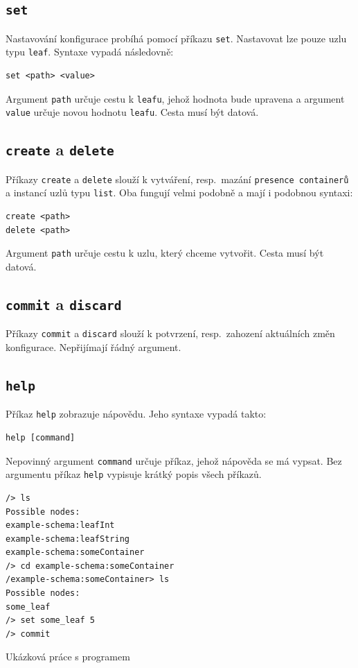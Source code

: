 \documentclass[thesis=B,czech,hidelinks]{FITthesis}[2019/03/06]
\begin{document}
\subsection{\texttt{set}}
Nastavování konfigurace probíhá pomocí příkazu \texttt{set}. Nastavovat lze pouze uzlu typu \texttt{leaf}. Syntaxe vypadá následovně:
\begin{verbatim}
set <path> <value>
\end{verbatim}
Argument \texttt{path} určuje cestu k \texttt{leafu}, jehož hodnota bude upravena a argument \texttt{value} určuje novou hodnotu \texttt{leafu}. Cesta musí být datová.

\subsection{\texttt{create} a \texttt{delete}}
Příkazy \texttt{create} a \texttt{delete} slouží k vytváření, resp.\ mazání \texttt{presence containerů} a instancí uzlů typu \texttt{list}. Oba fungují velmi podobně a mají i podobnou syntaxi:
\begin{verbatim}
create <path>
delete <path>
\end{verbatim}
Argument \texttt{path} určuje cestu k uzlu, který chceme vytvořit. Cesta musí být datová.
\subsection{\texttt{commit} a \texttt{discard}}
Příkazy \texttt{commit} a \texttt{discard} slouží k potvrzení, resp.\ zahození aktuálních změn konfigurace. Nepřijímají řádný argument.
\subsection{\texttt{help}}
Příkaz \texttt{help} zobrazuje nápovědu. Jeho syntaxe vypadá takto:
\begin{verbatim}
help [command]
\end{verbatim}
Nepovinný argument \texttt{command} určuje příkaz, jehož nápověda se má vypsat. Bez argumentu příkaz \texttt{help} vypisuje krátký popis všech příkazů.


\begin{listing}
\begin{verbatim}
/> ls
Possible nodes:
example-schema:leafInt
example-schema:leafString
example-schema:someContainer
/> cd example-schema:someContainer
/example-schema:someContainer> ls
Possible nodes:
some_leaf
/> set some_leaf 5
/> commit
\end{verbatim}
\caption{Ukázková práce s programem}\label{ukazka:program}
\end{listing}
\end{document}
